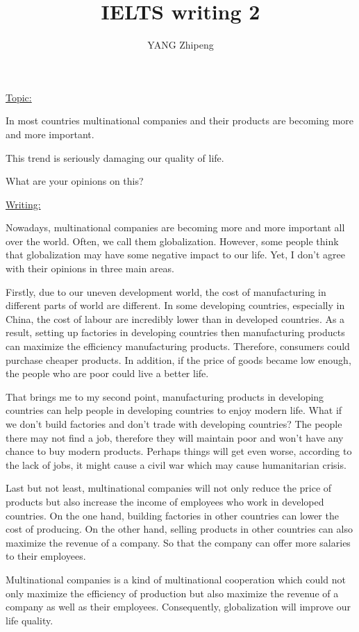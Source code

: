 \documentclass[UTF8]{ctexart}
\title{IELTS writing 2}
\author{YANG Zhipeng}
\date{}
\begin{document}
\maketitle
\noindent
\LARGE{\underline{Topic:}}

\normalsize{In most countries multinational companies and their products are becoming more and more important.

This trend is seriously damaging our quality of life.

What are your opinions on this?}

\noindent
\LARGE{\underline{Writing:}}

\normalsize{Nowadays, multinational companies are becoming more and more important all over the world. Often, we call them globalization. However, some people think that globalization may have some negative impact to our life. Yet, I don't agree with their opinions in three main areas.

Firstly, due to our uneven development world, the cost of manufacturing in different parts of world are different. In some developing countries, especially in China, the cost of labour are incredibly lower than in developed countries. As a result, setting up factories in developing countries then manufacturing products can maximize the efficiency manufacturing products. Therefore, consumers could purchase cheaper
products. In addition, if the price of goods became low enough, the people who are poor could live a better life.

That brings me to my second point, manufacturing products in developing countries can help people in developing countries to enjoy modern life. What if we don't build factories and don't trade with developing countries? The people there may not find a job, therefore they will maintain poor and won't have any chance to buy modern products. Perhaps things will get even worse, according to the lack of jobs, it might cause a
civil war which may cause humanitarian crisis.

Last but not least, multinational companies will not only reduce the price of products but also increase the income of employees who work in
developed countries. On the one hand, building factories in other countries can lower the cost of producing. On the other hand, selling
products in other countries can also maximize the revenue of a company. So that the company can offer more salaries to their employees.

Multinational companies is a kind of multinational cooperation which could not only maximize the efficiency of production
but also maximize the revenue of a company as well as their employees. Consequently, globalization will improve our life
quality.}
\end{document}
